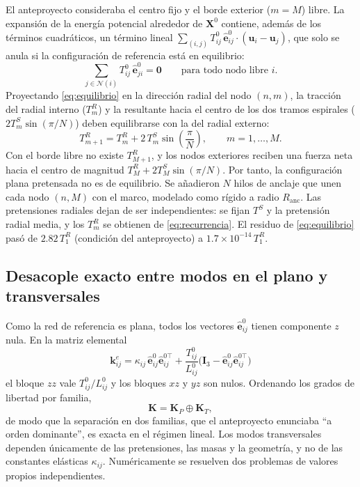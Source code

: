 \documentclass[11pt,letterpaper]{article}
\begin{document}
El anteproyecto consideraba el centro fijo y el borde exterior ($m=M$)
libre. La expansión de la energía potencial alrededor de $\mathbf{X}^0$
contiene, además de los términos cuadráticos, un término lineal
$\sum_{(i,j)} T^0_{ij}\,\hat{\mathbf{e}}^0_{ij}\cdot(\mathbf{u}_i-\mathbf{u}_j)$,
que solo se anula si la configuración de referencia está en equilibrio:
\begin{equation}\label{eq:equilibrio}
    \sum_{j\in\mathcal{N}(i)} T^0_{ij}\,\hat{\mathbf{e}}^0_{ji} = \mathbf{0}
    \qquad \text{para todo nodo libre } i.
\end{equation}
Proyectando \eqref{eq:equilibrio} en la dirección radial del nodo $(n,m)$,
la tracción del radial interno ($T^R_m$) y la resultante hacia el centro de
los dos tramos espirales ($2T^S_m\sin(\pi/N)$) deben equilibrarse con la
del radial externo:
\begin{equation}\label{eq:recurrencia}
    T^R_{m+1} = T^R_m + 2\,T^S_m\sin\!\left(\frac{\pi}{N}\right),
    \qquad m = 1,\dots,M.
\end{equation}
Con el borde libre no existe $T^R_{M+1}$, y los nodos exteriores reciben una
fuerza neta hacia el centro de magnitud $T^R_M + 2T^S_M\sin(\pi/N)$. Por
tanto, la configuración plana pretensada no es de equilibrio. Se añadieron
$N$ hilos de anclaje que unen cada nodo $(n,M)$ con el marco, modelado como
rígido a radio $R_{\text{anc}}$. Las pretensiones radiales dejan de ser
independientes: se fijan $T^S$ y la pretensión radial media, y los $T^R_m$
se obtienen de \eqref{eq:recurrencia}. El residuo de
\eqref{eq:equilibrio} pasó de $2.82\,T^R_1$ (condición del anteproyecto) a
$1.7\times10^{-14}\,T^R_1$.

\subsection{Desacople exacto entre modos en el plano y transversales}

Como la red de referencia es plana, todos los vectores
$\hat{\mathbf{e}}^0_{ij}$ tienen componente $z$ nula. En la matriz elemental
\begin{equation}\label{eq:ke_ajuste}
    \mathbf{k}^e_{ij}=\kappa_{ij}\,\hat{\mathbf{e}}^0_{ij}\hat{\mathbf{e}}^{0\top}_{ij}
    +\frac{T^0_{ij}}{L^0_{ij}}\bigl(\mathbf{I}_3-\hat{\mathbf{e}}^0_{ij}\hat{\mathbf{e}}^{0\top}_{ij}\bigr)
\end{equation}
el bloque $zz$ vale $T^0_{ij}/L^0_{ij}$ y los bloques $xz$ y $yz$ son nulos.
Ordenando los grados de libertad por familia,
\begin{equation}\label{eq:desacople}
    \mathbf{K} = \mathbf{K}_P \oplus \mathbf{K}_T,
\end{equation}
de modo que la separación en dos familias, que el anteproyecto enunciaba
``a orden dominante'', es exacta en el régimen lineal. Los modos
transversales dependen únicamente de las pretensiones, las masas y la
geometría, y no de las constantes elásticas $\kappa_{ij}$. Numéricamente se
resuelven dos problemas de valores propios independientes.
\end{document}

